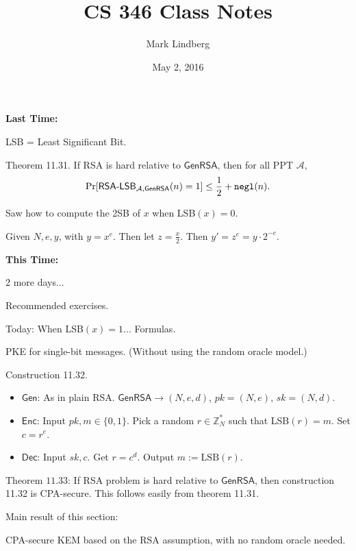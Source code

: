 \documentclass[12pt]{article}
\newcommand{\Z}{\mathbb{Z}}
\newcommand{\AAA}{\mathcal{A}}
\newcommand{\Enc}{\mathsf{Enc}}
\newcommand{\Dec}{\mathsf{Dec}}
\newcommand{\Gen}{\mathsf{Gen}}
\newcommand{\GenRSA}{\mathsf{GenRSA}}
\newcommand{\ExptRSALSBArgs}[2]{\mathsf{RSA\text{-}LSB}_{#1,#2}}
\newcommand{\ExptRSALSB}{\ExptRSALSBArgs{\AAA}{\GenRSA}}
\newcommand{\negl}{{\tt negl}}
\begin{document}
\title{CS 346 Class Notes}
\date{May 2, 2016}
\author{Mark Lindberg}
\maketitle
\thispagestyle{fancy}

{\bf Last Time:}

LSB = Least Significant Bit.

Theorem 11.31. If RSA is hard relative to $\GenRSA$, then for all PPT $\AAA$, $$\Pr[\ExptRSALSB(n)=1]\leq\frac{1}{2}+\negl(n).$$

Saw how to compute the 2SB of $x$ when LSB$(x)=0$.

Given $N,e,y$, with $y=x^e$. Then let $z=\frac{x}{2}$. Then $y'=z^e=y\cdot2^{-e}$.

{\bf This Time:}

2 more days...

Recommended exercises.

Today: When LSB$(x)=1$... Formulas.

PKE for single-bit messages. (Without using the random oracle model.)

Construction 11.32.\begin{itemize}

\item $\Gen$: As in plain RSA. $\GenRSA\to(N,e,d)$, $pk=(N,e)$, $sk=(N,d)$.

\item $\Enc$: Input $pk,m\in\{0,1\}$. Pick a random $r\in\Z_N^*$ such that LSB$(r)=m$. Set $c=r^e$.

\item $\Dec$: Input $sk,c$. Get $r=c^d$. Output $m:=\text{LSB}(r)$.

\end{itemize}

Theorem $11.33$: If RSA problem is hard relative to $\GenRSA$, then construction 11.32 is CPA-secure. This follows easily from theorem 11.31.

Main result of this section:

CPA-secure KEM based on the RSA assumption, with no random oracle needed.
\end{document}
